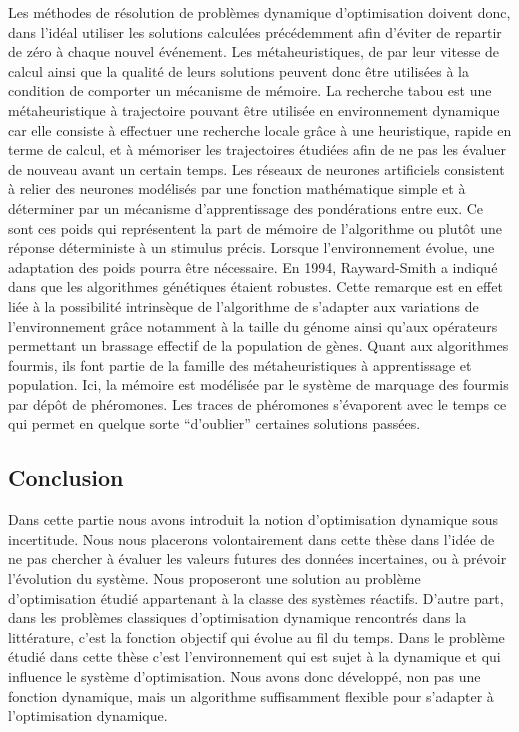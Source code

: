 Les méthodes de résolution de problèmes dynamique d'optimisation doivent donc, dans l'idéal utiliser les solutions calculées précédemment afin d'éviter de repartir de zéro à chaque nouvel événement. Les métaheuristiques, de par leur vitesse de calcul ainsi que la qualité de leurs solutions peuvent donc être utilisées à la condition de comporter un mécanisme de mémoire.
La recherche tabou est une métaheuristique à trajectoire pouvant être utilisée en environnement dynamique car elle consiste à effectuer une recherche locale grâce à une heuristique, rapide en terme de calcul, et à mémoriser les trajectoires étudiées afin de ne pas les évaluer de nouveau avant un certain temps.
Les réseaux de neurones artificiels consistent à relier des neurones modélisés par une fonction mathématique simple et à déterminer par un mécanisme d'apprentissage des pondérations entre eux. Ce sont ces poids qui représentent la part de mémoire de l'algorithme ou plutôt une réponse déterministe à un stimulus précis. Lorsque l'environnement évolue, une adaptation des poids pourra être nécessaire.
En 1994, Rayward-Smith a indiqué dans \cite{Rayward1994} que les algorithmes génétiques étaient robustes. Cette remarque est en effet liée à la possibilité intrinsèque de l'algorithme de s'adapter aux variations de l'environnement grâce notamment à la taille du génome ainsi qu'aux opérateurs permettant un brassage effectif de la population de gènes.
Quant aux algorithmes fourmis, ils font partie de la famille des métaheuristiques à apprentissage et population. Ici, la mémoire est modélisée par le système de marquage des fourmis par dépôt de phéromones. Les traces de phéromones s'évaporent avec le temps ce qui permet en quelque sorte ``d'oublier'' certaines solutions passées.

\subsection*{Conclusion}
Dans cette partie nous avons introduit la notion d'optimisation dynamique sous incertitude. Nous nous placerons volontairement dans cette thèse dans l'idée de ne pas chercher à évaluer les valeurs futures des données incertaines, ou à prévoir l'évolution du système. Nous proposeront une solution au problème d'optimisation étudié appartenant à la classe des systèmes réactifs. D'autre part, dans les problèmes classiques d'optimisation dynamique rencontrés dans la littérature, c'est la fonction objectif qui évolue au fil du temps. Dans le problème étudié dans cette thèse c'est l'environnement qui est sujet à la dynamique et qui influence le système d'optimisation. Nous avons donc développé, non pas une fonction dynamique, mais un algorithme suffisamment flexible pour s'adapter à l'optimisation dynamique.